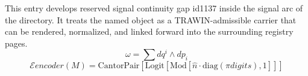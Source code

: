
\begin{tzpsnapshot}
\end{tzpsnapshot}

This entry develops reserved signal continuity gap id1137 inside the signal arc of the directory. It treats the named object as a TRAWIN-admissible carrier that can be rendered, normalized, and linked forward into the surrounding registry pages.
\[
\omega = \sum dq^i \wedge dp_i
\]
\[
\mathcal{E} {encoder}(M) = \text{CantorPair}[\text{Logit}[\text{Mod}[\hat{n} \cdot \text{diag}(\pi {digits}), 1]]]
\]

